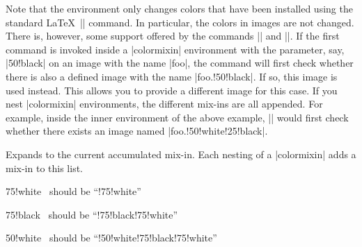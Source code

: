 Note that the environment only changes colors that have been installed
using the standard \LaTeX\ |\color| command. In particular,
the colors in images are not changed. There is, however, some support
offered by the commands |\pgfuseimage| and
|\pgfuseshading|. If the first command is invoked
inside a |colormixin| environment with the parameter, say,
|50!black| on an image with the name |foo|, the command
will first check whether there is also a defined image with the name
|foo.!50!black|. If so, this image is used instead. This allows
you to provide a different image for this case. If you nest
|colormixin| environments, the different mix-ins are all appended. For
example, inside the inner environment of
the above example, || would first check whether
there exists an image named |foo.!50!white!25!black|.

\begin{command}{}
  Expands to the current accumulated mix-in. Each nesting of a
  |colormixin| adds a mix-in to this list.
\begin{codeexample}[]
\begin{minipage}{\linewidth-6pt}\raggedright
\begin{colormixin}{75!white}
  \ should be ``!75!white''\par
  \begin{colormixin}{75!black}
    \ should be ``!75!black!75!white''\par
    \begin{colormixin}{50!white}
      \ should be ``!50!white!75!black!75!white''\par
    \end{colormixin}
  \end{colormixin}
\end{colormixin}
\end{minipage}
\end{codeexample}
\end{command}




